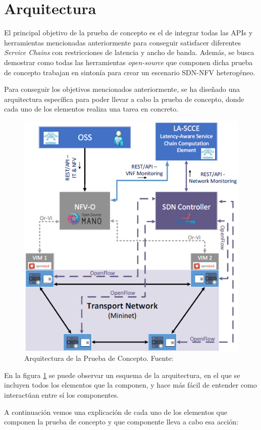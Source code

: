 \section{Arquitectura}
\label{sec:arquitectura}

El principal objetivo de la prueba de concepto es el de integrar todas las \acp{API} y herramientas mencionadas anteriormente para conseguir satisfacer diferentes \textit{Service Chains} con restricciones de latencia y ancho de banda. Además, se busca demostrar como todas las herramientas \textit{open-source} que componen dicha prueba de concepto trabajan en sintonía para crear un escenario \ac{SDN}-\ac{NFV} heterogéneo.

Para conseguir los objetivos mencionados anteriormente, se ha diseñado una arquitectura específica para poder llevar a cabo la prueba de concepto, donde cada uno de los elementos realiza una tarea en concreto.

\begin{figure}[!ht]
	\centering
	\includegraphics[width=0.7\linewidth]{imagenes/esquema_demo}
	\caption{Arquitectura de la Prueba de Concepto. Fuente:\cite{demoecocbib}}
	\label{fig:esquemademo}
\end{figure}

En la figura \ref{fig:esquemademo} se puede observar un esquema de la arquitectura, en el que se incluyen todos los elementos que la componen, y hace más fácil de entender como interactúan entre sí los componentes.

A continuación vemos una explicación de cada uno de los elementos que componen la prueba de concepto y que componente lleva a cabo esa acción:

